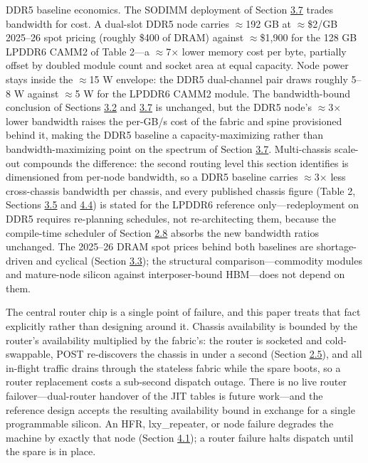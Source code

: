 \documentclass[10pt,twocolumn]{article}
\begin{document}
DDR5 baseline economics. The SODIMM deployment of Section \hyperref[sec:3.7]{3.7} trades bandwidth for cost. A dual-slot DDR5 node carries $\approx$192 GB at $\approx$\$2/GB 2025--26 spot pricing (roughly \$400 of DRAM) against $\approx$\$1,900 for the 128 GB LPDDR6 CAMM2 of Table 2---a $\approx$7$\times$ lower memory cost per byte, partially offset by doubled module count and socket area at equal capacity. Node power stays inside the $\approx$15 W envelope: the DDR5 dual-channel pair draws roughly 5--8 W against $\approx$5 W for the LPDDR6 CAMM2 module. The bandwidth-bound conclusion of Sections \hyperref[sec:3.2]{3.2} and \hyperref[sec:3.7]{3.7} is unchanged, but the DDR5 node's $\approx$3$\times$ lower bandwidth raises the per-GB/s cost of the fabric and spine provisioned behind it, making the DDR5 baseline a capacity-maximizing rather than bandwidth-maximizing point on the spectrum of Section \hyperref[sec:3.7]{3.7}. Multi-chassis scale-out compounds the difference: the second routing level this section identifies is dimensioned from per-node bandwidth, so a DDR5 baseline carries $\approx$3$\times$ less cross-chassis bandwidth per chassis, and every published chassis figure (Table 2, Sections \hyperref[sec:3.5]{3.5} and \hyperref[sec:4.4]{4.4}) is stated for the LPDDR6 reference only---redeployment on DDR5 requires re-planning schedules, not re-architecting them, because the compile-time scheduler of Section \hyperref[sec:2.8]{2.8} absorbs the new bandwidth ratios unchanged. The 2025--26 DRAM spot prices behind both baselines are shortage-driven and cyclical (Section \hyperref[sec:3.3]{3.3}); the structural comparison---commodity modules and mature-node silicon against interposer-bound HBM---does not depend on them.

The central router chip is a single point of failure, and this paper treats that fact explicitly rather than designing around it. Chassis availability is bounded by the router's availability multiplied by the fabric's: the router is socketed and cold-swappable, POST re-discovers the chassis in under a second (Section \hyperref[sec:2.5]{2.5}), and all in-flight traffic drains through the stateless fabric while the spare boots, so a router replacement costs a sub-second dispatch outage. There is no live router failover---dual-router handover of the JIT tables is future work---and the reference design accepts the resulting availability bound in exchange for a single programmable silicon. An HFR, lxy\_repeater, or node failure degrades the machine by exactly that node (Section \hyperref[sec:4.1]{4.1}); a router failure halts dispatch until the spare is in place.
\end{document}
